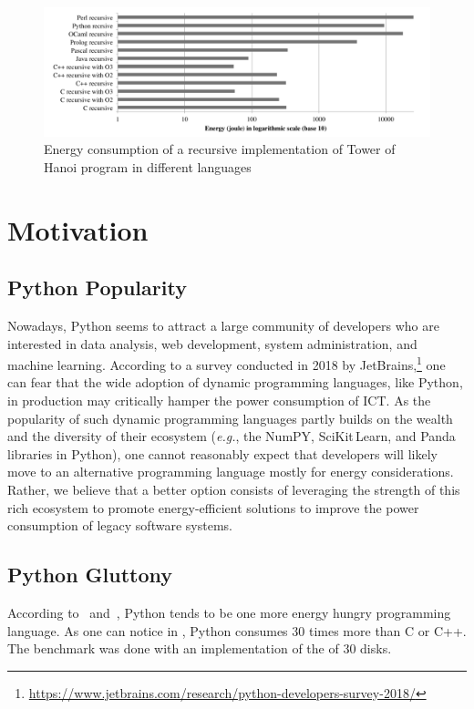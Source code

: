 \begin{figure}[htbp]
    \includegraphics[width=\linewidth]{imgs/hannoiimplementation.png}
    \caption{Energy consumption of a recursive implementation of Tower of Hanoi program in different languages~\cite{noureddine_preliminary_2012}}
    \label{fig:hannoi}
\end{figure}

\section{Motivation}

\subsection{Python Popularity}
Nowadays, Python seems to attract a large community of developers who are interested in data analysis, web development, system administration, and machine learning.
According to a survey conducted in 2018 by JetBrains,\footnote{\url{https://www.jetbrains.com/research/python-developers-survey-2018/}} one can fear that the wide adoption of dynamic programming languages, like Python, in production may critically hamper the power consumption of ICT.
As the popularity of such dynamic programming languages partly builds on the wealth and the diversity of their ecosystem (\emph{e.g.}, the NumPY, SciKit\,Learn, and Panda libraries in Python), one cannot reasonably expect that developers will likely move to an alternative programming language mostly for energy considerations.
Rather, we believe that a better option consists of leveraging the strength of this rich ecosystem to promote energy-efficient solutions to improve the power consumption of legacy software systems.

\subsection{Python Gluttony}
According to~\cite{pinto_energy_2017} and~\cite{noureddine_preliminary_2012}, Python tends to be one more energy hungry programming language.
As one can notice in , Python consumes $30$ times more than C or C++.
The benchmark was done with an implementation of the  of 30 disks.

